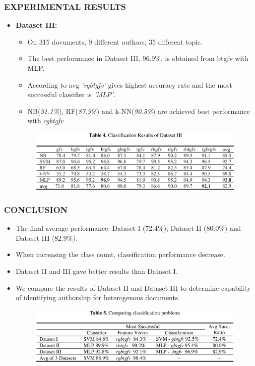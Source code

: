 \documentclass{beamer}
\begin{document}
 
  \begin{frame}
  \frametitle{EXPERIMENTAL RESULTS}
  \begin{itemize}
   \item \textbf{Dataset III:} 
	\begin{itemize}
	\item On 315 documents, 9 different authors, 35 different topic.
	\item The best performance in Dataset III, 96.9\%, is obtained from btgfv with MLP. 
	\item According to avg \textit{'rgbtgfv'} gives highest accuracy rate and the most successful classifier is \textit{'MLP'}. 
	\item NB(\emph{91.1\%}), RF(\emph{87.9\%}) and k-NN(\emph{90.5\%}) are achieved best performance with \textit{rgbtgfv}
	\end{itemize}
	
	  \begin{figure}[h]
    \begin{center}
      \includegraphics[scale=0.22]{table_4.png}
    \end{center}
   \end{figure}
  
  \end{itemize}
 \end{frame}
 
 
 \begin{frame}
  \frametitle{CONCLUSION}
  \begin{itemize}
   \item The final average performance: Dataset I (72.4\%), Dataset II (80.0\%) and Dataset III (82.9\%).
   \item When increasing the class count, classification performance decrease. 
   \item Dataset II and III gave better results than Dataset I. 
   \item We compare the results of Dataset II and Dataset III to determine capability of identifying authorship for heterogenous documents.
   
    \begin{figure}[h]
    \begin{center}
      \includegraphics[scale=0.2]{table_5.png}
    \end{center}
   \end{figure}
  \end{itemize}
 \end{frame}
 
\end{document}
